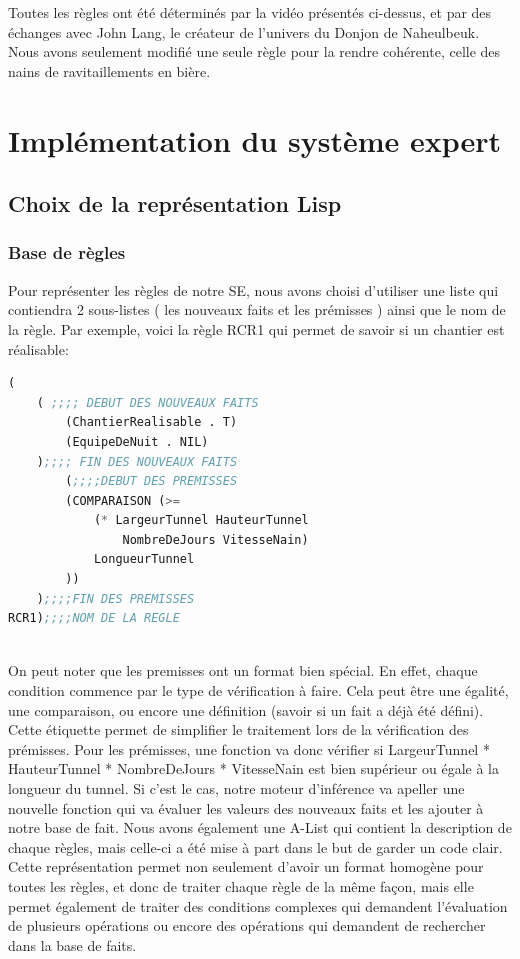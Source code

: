 \documentclass[a4paper,10pt]{report}
\begin{document}
Toutes les règles ont été déterminés par la vidéo présentés ci-dessus, et par des échanges avec John Lang, le créateur de l’univers du Donjon de Naheulbeuk. Nous avons seulement modifié une seule règle pour la rendre cohérente, celle des nains de ravitaillements en bière. 



\chapter{Implémentation du système expert}
  \section{Choix de la représentation Lisp}
    \subsection{Base de règles}
    Pour représenter les règles de notre SE, nous avons choisi d'utiliser une liste qui contiendra 2 sous-listes ( les nouveaux faits et les prémisses ) 
    ainsi que le nom de la règle. Par exemple, voici la règle RCR1 qui permet de savoir si un chantier est réalisable:\newline
    \begin{lstlisting}[language=Lisp]
(
	( ;;;; DEBUT DES NOUVEAUX FAITS
		(ChantierRealisable . T)
		(EquipeDeNuit . NIL)
	);;;; FIN DES NOUVEAUX FAITS
		(;;;;DEBUT DES PREMISSES
		(COMPARAISON (>=
			(* LargeurTunnel HauteurTunnel 
			    NombreDeJours VitesseNain)
			LongueurTunnel
		))
	);;;;FIN DES PREMISSES
RCR1);;;;NOM DE LA REGLE
     
    \end{lstlisting}
    
    On peut noter que les premisses ont un format bien spécial. En effet, chaque condition commence par le type de vérification à faire. Cela peut être une égalité,
    une comparaison, ou encore une définition (savoir si un fait a déjà été défini). Cette étiquette permet de simplifier le traitement lors de la vérification
    des prémisses. Pour les prémisses, une fonction va donc vérifier si LargeurTunnel * HauteurTunnel * NombreDeJours * VitesseNain est bien supérieur ou égale à la
    longueur du tunnel. Si c'est le cas, notre moteur d'inférence va apeller une nouvelle fonction qui va évaluer les valeurs des nouveaux faits et les ajouter à
    notre base de fait. Nous avons également une A-List qui contient la description de chaque règles, mais celle-ci a été mise à part dans le but de garder un code
    clair. Cette représentation permet non seulement d'avoir un format homogène pour toutes les règles, et donc de traiter chaque règle de la même façon, mais elle
    permet également de traiter des conditions complexes qui demandent l'évaluation de plusieurs opérations ou encore des opérations qui demandent de rechercher
    dans la base de faits.
\end{document}
